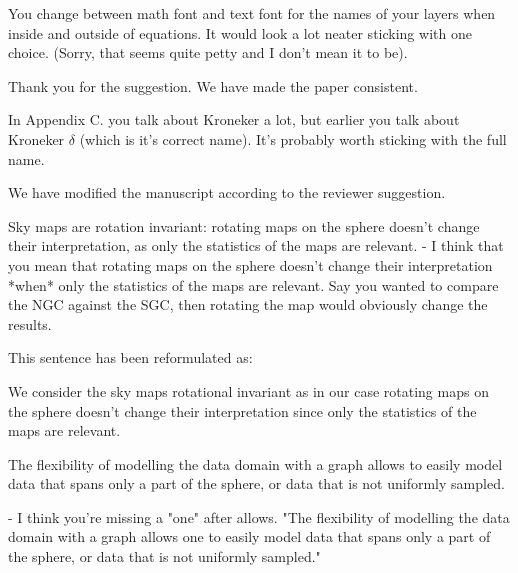\documentclass[12pt,a4paper]{article}
\newcommand{\nati}[1]{{\color[rgb]{.1,.6,.1}{NP: #1}}}
\newcommand{\TK}[1]{{\color{red}{TK: #1}}}
\newcommand{\1}{\b{1}}              %
\newcommand{\0}{\b{0}}              %
\begin{document}
\begin{mdframed}[style=comment]
You change between math font and text font for the names of your layers when inside and outside of equations. It would look a lot neater sticking with one choice. (Sorry, that seems quite petty and I don't mean it to be).
\end{mdframed}
Thank you for the suggestion. We have made the paper consistent.
\nati{@all, when you read the paper, please check that I did not forget some of them. Every layer has been changed to math symbols as we use them like function. For example, SM becomes $SM$.}

\begin{mdframed}[style=comment]
In Appendix C. you talk about Kroneker a lot, but earlier you talk about Kroneker $\delta$ (which is it's correct name). It's probably worth sticking with the full name.
\end{mdframed}
We have modified the manuscript according to the reviewer suggestion.

\begin{mdframed}[style=comment]
Sky maps are rotation invariant: rotating maps on the sphere doesn’t change their interpretation, as only the statistics of the maps are relevant.
- I think that you mean that rotating maps on the sphere doesn't change their interpretation *when* only the statistics of the maps are relevant. Say you wanted to compare the NGC against the SGC, then rotating the map would obviously change the results.
\end{mdframed}
This sentence has been reformulated as:
\begin{mdframed}[style=manuscript]
We consider the sky maps rotational invariant as in our case rotating maps on the sphere doesn't change their interpretation since only the statistics of the maps are relevant.
\end{mdframed}

\begin{mdframed}[style=comment]
The flexibility of modelling the data domain with a graph allows to easily model data that spans only a part of the sphere, or data that is not uniformly sampled.

- I think you're missing a "one" after allows. "The flexibility of modelling the data domain with a graph allows one to easily model data that spans only a part of the sphere, or data that is not uniformly sampled."
\end{mdframed}
\TK{Thank you for the suggestion, we updated the text.}
\end{document}
